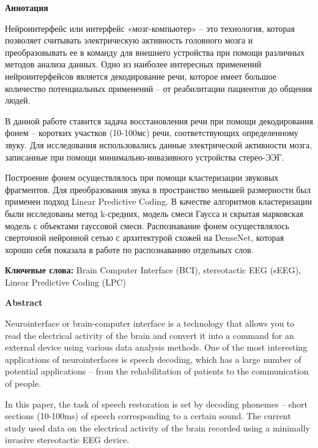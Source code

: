 \documentclass[a4paper,14pt]{extarticle}
\begin{document}
\newpage
\begin{center}
	\textbf{Аннотация}
\end{center}

Нейроинтерфейс или интерфейс «мозг-компьютер» – это технология, которая позволяет считывать электрическую активность головного мозга и преобразовывать ее в команду для внешнего устройства при помощи различных методов анализа данных. Одно из наиболее интересных применений нейроинтерфейсов является декодирование речи, которое имеет большое количество потенциальных применений – от реабилитации пациентов до общения людей.

В данной работе ставится задача восстановления речи при помощи декодирования фонем – коротких участков (10-100мс) речи,  соответствующих определенному звуку. Для исследования использовались данные электрической активности мозга, записанные при помощи минимально-инвазивного устройства стерео-ЭЭГ. 

Построение фонем осуществлялось при помощи кластеризации звуковых фрагментов. Для преобразования звука в пространство меньшей размерности был применен подход Linear Predictive Coding. В качестве алгоритмов кластеризации были исследованы метод k-средних, модель смеси Гаусса и скрытая марковская модель с объектами гауссовой смеси. Распознавание фонем осуществлялось сверточной нейронной сетью с архитектурой схожей на DenseNet, которая хорошо себя показала в работе по распознаванию отдельных слов.

\textbf{Ключевые слова:} Brain Computer Interface (BCI), stereotactic EEG (sEEG), Linear Predictive Coding (LPC)

\newpage
\begin{center}
	\textbf{Abstract}
\end{center}

Neurointerface or brain-computer interface is a technology that allows you to read the electrical activity of the brain and convert it into a command for an external device using various data analysis methods. One of the most interesting applications of neurointerfaces is speech decoding, which has a large number of potential applications – from the rehabilitation of patients to the communication of people.

In this paper, the task of speech restoration is set by decoding phonemes – short sections (10-100ms) of speech corresponding to a certain sound. The current study used data on the electrical activity of the brain recorded using a minimally invasive stereotactic EEG device.
\end{document}
